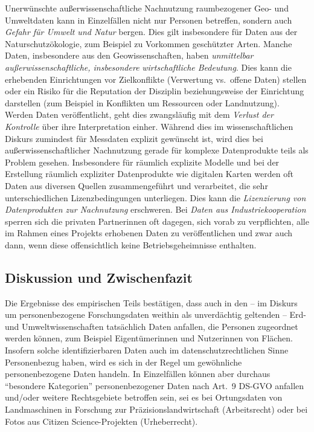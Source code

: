 \documentclass[a4paper,
fontsize=11pt,
oneside,
numbers=noperiodatend,
parskip=half-,
bibliography=totoc,
final
]{scrartcl}
\begin{document}
Unerwünschte außerwissenschaftliche Nachnutzung raumbezogener Geo- und
Umweltdaten kann in Einzelfällen nicht nur Personen betreffen, sondern
auch \emph{Gefahr für Umwelt und Natur} bergen. Dies gilt insbesondere
für Daten aus der Naturschutzökologie, zum Beispiel zu Vorkommen
geschützter Arten. Manche Daten, insbesondere aus den Geowissenschaften,
haben \emph{unmittelbar außerwissenschaftliche, insbesondere}
\emph{wirtschaftliche Bedeutung}. Dies kann die erhebenden Einrichtungen
vor Zielkonflikte (Verwertung vs.~offene Daten) stellen oder ein Risiko
für die Reputation der Disziplin beziehungsweise der Einrichtung
darstellen (zum Beispiel in Konflikten um Ressourcen oder Landnutzung).
Werden Daten veröffentlicht, geht dies zwangsläufig mit dem
\emph{Verlust der Kontrolle} über ihre Interpretation einher. Während
dies im wissenschaftlichen Diskurs zumindest für Messdaten explizit
gewünscht ist, wird dies bei außerwissenschaftlicher Nachnutzung gerade
für komplexe Datenprodukte teils als Problem gesehen. Insbesondere für
räumlich explizite Modelle und bei der Erstellung räumlich expliziter
Datenprodukte wie digitalen Karten werden oft Daten aus diversen Quellen
zusammengeführt und verarbeitet, die sehr unterschiedlichen
Lizenzbedingungen unterliegen. Dies kann die \emph{Lizenzierung von
Datenprodukten zur Nachnutzung} erschweren. Bei \emph{Daten aus
Industriekooperation} sperren sich die privaten Partnerinnen oft
dagegen, sich vorab zu verpflichten, alle im Rahmen eines Projekts
erhobenen Daten zu veröffentlichen und zwar auch dann, wenn diese
offensichtlich keine Betriebsgeheimnisse enthalten.

\hypertarget{diskussion-und-zwischenfazit-1}{%
\subsection{Diskussion und
Zwischenfazit}\label{diskussion-und-zwischenfazit-1}}

Die Ergebnisse des empirischen Teils bestätigen, dass auch in den -- im
Diskurs um personenbezogene Forschungsdaten weithin als unverdächtig
geltenden -- Erd- und Umweltwissenschaften tatsächlich Daten anfallen,
die Personen zugeordnet werden können, zum Beispiel Eigentümerinnen und
Nutzerinnen von Flächen. Insofern solche identifizierbaren Daten auch im
datenschutzrechtlichen Sinne Personenbezug haben, wird es sich in der
Regel um gewöhnliche personenbezogene Daten handeln. In Einzelfällen
können aber durchaus \enquote{besondere Kategorien} personenbezogener
Daten nach Art.~9 DS-GVO anfallen und/oder weitere Rechtsgebiete
betroffen sein, sei es bei Ortungsdaten von Landmaschinen in Forschung
zur Präzisionslandwirtschaft (Arbeitsrecht) oder bei Fotos aus Citizen
Science-Projekten (Urheberrecht).
\end{document}
